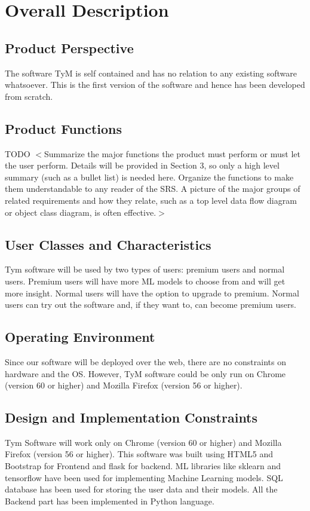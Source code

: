 \documentclass{scrreprt}
\begin{document}
\chapter{Overall Description}

\section{Product Perspective}
The software TyM is self contained and has no relation to any existing software whatsoever. This is the first version of the software and hence has been developed from scratch.

\section{Product Functions}
TODO
$<$Summarize the major functions the product must perform or must let the user 
perform. Details will be provided in Section 3, so only a high level summary 
(such as a bullet list) is needed here. Organize the functions to make them 
understandable to any reader of the SRS. A picture of the major groups of 
related requirements and how they relate, such as a top level data flow diagram 
or object class diagram, is often effective.$>$

\section{User Classes and Characteristics}
Tym software will be used by two types of users: premium users and normal users. Premium users will have more ML models to choose from and will get more insight. Normal users will have the option to upgrade to premium. Normal users can try out the software and, if they want to, can become premium users.

\section{Operating Environment}
Since our software will be deployed over the web, there are no constraints on hardware and the OS. However, TyM software could be only run on Chrome (version 60 or higher) and Mozilla Firefox (version 56 or higher).

\section{Design and Implementation Constraints}
Tym Software will work only on Chrome (version 60 or higher) and Mozilla Firefox (version 56 or higher). This software was built using HTML5 and Bootstrap for Frontend and flask for backend. ML libraries like sklearn and tensorflow have been used for implementing Machine Learning models. SQL database has been used for storing the user data and their models. All the Backend part has been implemented in Python language.
\end{document}
